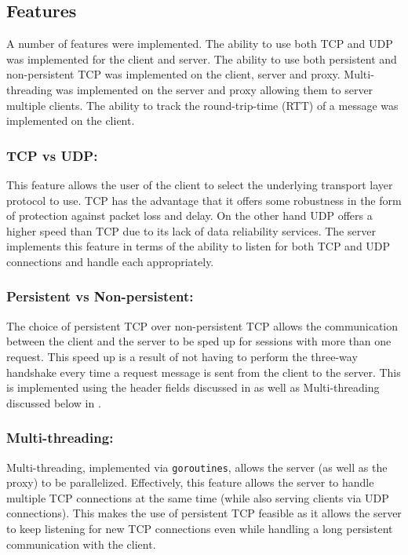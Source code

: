 \documentclass[10pt,twocolumn]{witseiepaper}
\begin{document}
\subsection{Features}

A number of features were implemented. The ability to use both TCP and UDP was implemented for the client and server. The ability to use both persistent and non-persistent TCP was implemented on the client, server and proxy. Multi-threading was implemented on the server and proxy allowing them to server multiple clients. The ability to track the round-trip-time (RTT) of a message was implemented on the client.

	\subsubsection{TCP vs UDP:}

	This feature allows the user of the client to select the underlying transport layer protocol to use. TCP has the advantage that it offers some robustness in the form of protection against packet loss and delay. On the other hand UDP offers a higher speed than TCP due to its lack of data reliability services. The server implements this feature in terms of the ability to listen for both TCP and UDP connections and handle each appropriately. 

	\subsubsection{Persistent vs Non-persistent:}

	The choice of persistent TCP over non-persistent TCP allows the communication between the client and the server to be sped up for sessions with more than one request. This speed up is a result of not having to perform the three-way handshake every time a request message is sent from the client to the server. This is implemented using the header fields discussed in  as well as Multi-threading discussed below in .

	\subsubsection{Multi-threading:} \label{thread}

	Multi-threading, implemented via \texttt{goroutines}, allows the server (as well as the proxy) to be parallelized. Effectively, this feature allows the server to handle multiple TCP connections at the same time (while also serving clients via UDP connections). This makes the use of persistent TCP feasible as it allows the server to keep listening for new TCP connections even while handling a long persistent communication with the client.
\end{document}
